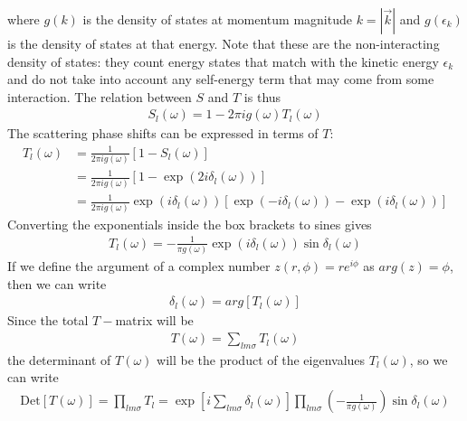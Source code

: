 \documentclass[twoside]{report}
\numberwithin{equation}{section}
\begin{document}
where \(g(k)\) is the density of states at momentum magnitude \(k = |\vec k|\) and \(g(\epsilon_k)\) is the density of states at that energy. Note that these are the non-interacting density of states: they count energy states that match with the kinetic energy \(\epsilon_k\) and do not take into account any self-energy term that may come from some interaction. The relation between \(S\) and \(T\) is thus
\begin{equation}\begin{aligned}
	\label{S_in_T}
	S_l(\omega) = 1 - 2 \pi i g(\omega) T_l(\omega)
\end{aligned}\end{equation}
The scattering phase shifts can be expressed in terms of \(T\):
\begin{equation}\begin{aligned}
	T_l(\omega) &= \frac{1}{2\pi i g(\omega)}\left[ 1 - S_l(\omega) \right]\\
		    &= \frac{1}{2\pi i g(\omega)}\left[1 - \exp\left( 2 i \delta_l(\omega) \right)\right]\\
		    &=\frac{1}{2\pi i g(\omega)}\exp\left(i \delta_l(\omega) \right)\left[\exp\left( - i \delta_l(\omega) \right) - \exp\left(i \delta_l(\omega) \right)\right]
\end{aligned}\end{equation}
Converting the exponentials inside the box brackets to sines gives
\begin{equation}\begin{aligned}
	\label{tmatphase}
	T_l(\omega) = -\frac{1}{\pi g(\omega)}\exp\left(i \delta_l(\omega) \right)\sin \delta_l(\omega)
\end{aligned}\end{equation}
If we define the argument of a complex number \(z(r,\phi) = r e^{i\phi}\) as \(arg(z) = \phi\), then we can write
\begin{equation}\begin{aligned}
	\delta_l(\omega) = arg\left[ T_l(\omega) \right] 
\end{aligned}\end{equation}
Since the total \(T-\)matrix will be 
\begin{equation}\begin{aligned}
	T(\omega) = \sum_{lm\sigma} T_l(\omega)
\end{aligned}\end{equation}
the determinant of \(T(\omega)\) will be the product of the eigenvalues \(T_l(\omega)\), so we can write
\begin{equation}\begin{aligned}
	\text{Det}\left[ T(\omega) \right] = \prod_{lm\sigma} T_l = \exp\left[ i\sum_{lm\sigma} \delta_l(\omega) \right] \prod_{lm\sigma}\left( -\frac{1}{\pi g(\omega)}\right)\sin \delta_l(\omega)
\end{aligned}\end{equation}
\end{document}
